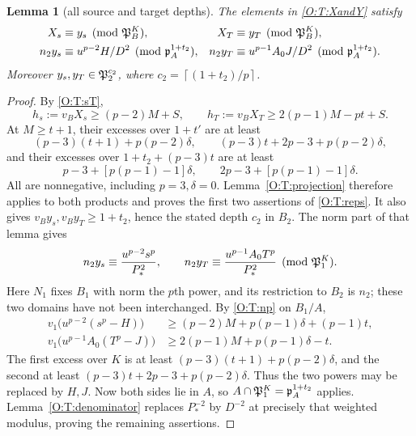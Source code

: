 \documentclass[11pt]{amsart}
\newtheorem{lemma}[theorem]{Lemma}
\theoremstyle{definition}
\theoremstyle{remark}
\newcommand{\ceil}[1]{\left\lceil #1\right\rceil}
\begin{document}
\begin{lemma}[all source and target depths]\label{O:T:representatives}
The elements in \eqref{O:T:XandY} satisfy
\begin{align}\label{O:T:reps}
 X_s&\equiv y_s\pmod{\mathfrak P_B^K},&
 X_T&\equiv y_T\pmod{\mathfrak P_B^K},\notag\\
 n_2y_s&\equiv u^{p-2}H/D^2\pmod{\mathfrak p_A^{1+t_2}},&
 n_2y_T&\equiv u^{p-1}A_0J/D^2\pmod{\mathfrak p_A^{1+t_2}}.
\end{align}
Moreover $y_s,y_T\in\mathfrak P_2^{c_2}$, where
$c_2=\ceil{(1+t_2)/p}$.
\end{lemma}
\begin{proof}
By \eqref{O:T:sT},
\[
 h_s:=v_BX_s\ge(p-2)M+S,\qquad
 h_T:=v_BX_T\ge2(p-1)M-pt+S.
\]
At $M\ge t+1$, their excesses over $1+t'$ are at least
\[
 (p-3)(t+1)+p(p-2)\delta,\qquad
 (p-3)t+2p-3+p(p-2)\delta,
\]
and their excesses over $1+t_2+(p-3)t$ are at least
\[
 p-3+[p(p-1)-1]\delta,\qquad
 2p-3+[p(p-1)-1]\delta.
\]
All are nonnegative, including $p=3,\delta=0$.
Lemma~\ref{O:T:projection} therefore applies to both products and proves
the first two assertions of \eqref{O:T:reps}. It also gives
$v_By_s,v_By_T\ge1+t_2$, hence the stated depth $c_2$ in $B_2$.
The norm part of that lemma gives
\[
 n_2y_s\equiv\frac{u^{p-2}s^p}{P_*^2},\qquad
 n_2y_T\equiv\frac{u^{p-1}A_0T^p}{P_*^2}
 \pmod{\mathfrak P_1^K}.
\]
Here $N_1$ fixes $B_1$ with norm the $p$th power, and its restriction
to $B_2$ is $n_2$; these two domains have not been interchanged.
By \eqref{O:T:np} on $B_1/A$,
\begin{align*}
 v_1\bigl(u^{p-2}(s^p-H)\bigr)
 &\ge(p-2)M+p(p-1)\delta+(p-1)t,\\
 v_1\bigl(u^{p-1}A_0(T^p-J)\bigr)
 &\ge2(p-1)M+p(p-1)\delta-t.
\end{align*}
The first excess over $K$ is at least
$(p-3)(t+1)+p(p-2)\delta$, and the second at least
$(p-3)t+2p-3+p(p-2)\delta$.
Thus the two powers may be replaced by $H,J$. Now both sides lie
in $A$, so $A\cap\mathfrak P_1^K=\mathfrak p_A^{1+t_2}$ applies.
Lemma~\ref{O:T:denominator} replaces $P_*^{-2}$ by $D^{-2}$ at precisely
that weighted modulus, proving the remaining assertions.
\end{proof}
\end{document}
